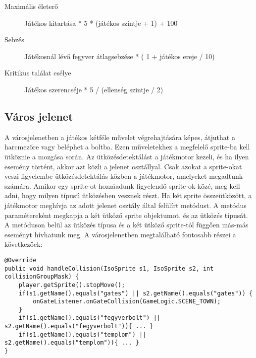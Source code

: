 \begin{description}
	\item [Maximális életerő] Játékos kitartása * 5 * (játékos szintje + 1) + 100
	\item [Sebzés] Játékosnál lévő fegyver átlagsebzése * ( 1 + játékos ereje / 10)
	\item [Kritikus találat esélye] Játékos szerencséje * 5 / (ellenség szintje / 2)
\end{description}


\subsection*{Város jelenet}
\label{varos}

A városjelenetben a játékos kétféle művelet végrehajtására képes, átjuthat a harcmezőre vagy beléphet a boltba. 
Ezen műveletekhez a megfelelő sprite-ba kell ütköznie a mozgása során. 
Az ütközésdetektálást a játékmotor kezeli, és ha ilyen esemény történt, akkor azt közli a jelenet osztállyal. 
Csak azokat a sprite-okat veszi figyelembe ütközésdetektálás közben a játékmotor, amelyeket megadtunk számára. 
Amikor egy sprite-ot hozzáadunk figyelendő sprite-ok közé, meg kell adni, hogy milyen típusú ütközésben vesznek részt. 
Ha két sprite összeütközött, a játékmotor meghívja az adott jelenet osztály által felülírt  metódust. 
A metódus paramétereként megkapja a két ütköző sprite objektumot, és az ütközés típusát. 
A metóduson belül az ütközés típusa és a két ütköző sprite-tól függően más-más eseményt hívhatunk meg. 
A városjelenetben megtalálható  fontosabb részei a következőek:

\begin{lstlisting}
@Override
public void handleCollision(IsoSprite s1, IsoSprite s2, int collisionGroupMask) {
    player.getSprite().stopMove();
    if(s1.getName().equals("gates") || s2.getName().equals("gates")) { 
        onGateListener.onGateCollision(GameLogic.SCENE_TOWN);
	}
    if(s1.getName().equals("fegyverbolt") || s2.getName().equals("fegyverbolt")){ ... }
    if(s1.getName().equals("templom") || s2.getName().equals("templom")){ ... }
}
\end{lstlisting}

